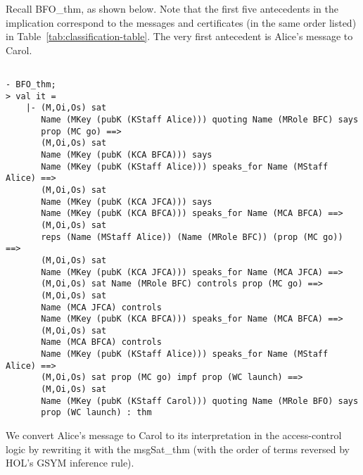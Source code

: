 \documentclass[10pt,twoside]{article}
\begin{document}
Recall BFO\_thm, as shown below. Note that the first five antecedents
in the implication correspond to the messages and certificates (in the
same order listed) in Table~\ref{tab:classification-table}. The very
first antecedent is Alice's message to Carol.
\begin{session}
  \begin{scriptsize}
\begin{verbatim}

- BFO_thm;
> val it =
    |- (M,Oi,Os) sat
       Name (MKey (pubK (KStaff Alice))) quoting Name (MRole BFC) says
       prop (MC go) ==>
       (M,Oi,Os) sat
       Name (MKey (pubK (KCA BFCA))) says
       Name (MKey (pubK (KStaff Alice))) speaks_for Name (MStaff Alice) ==>
       (M,Oi,Os) sat
       Name (MKey (pubK (KCA JFCA))) says
       Name (MKey (pubK (KCA BFCA))) speaks_for Name (MCA BFCA) ==>
       (M,Oi,Os) sat
       reps (Name (MStaff Alice)) (Name (MRole BFC)) (prop (MC go)) ==>
       (M,Oi,Os) sat
       Name (MKey (pubK (KCA JFCA))) speaks_for Name (MCA JFCA) ==>
       (M,Oi,Os) sat Name (MRole BFC) controls prop (MC go) ==>
       (M,Oi,Os) sat
       Name (MCA JFCA) controls
       Name (MKey (pubK (KCA BFCA))) speaks_for Name (MCA BFCA) ==>
       (M,Oi,Os) sat
       Name (MCA BFCA) controls
       Name (MKey (pubK (KStaff Alice))) speaks_for Name (MStaff Alice) ==>
       (M,Oi,Os) sat prop (MC go) impf prop (WC launch) ==>
       (M,Oi,Os) sat
       Name (MKey (pubK (KStaff Carol))) quoting Name (MRole BFO) says
       prop (WC launch) : thm
\end{verbatim}
  \end{scriptsize}
\end{session}
We convert Alice's message to Carol to its interpretation in the
access-control logic by rewriting it with the msgSat\_thm (with the
order of terms reversed by HOL's GSYM inference rule).
\end{document}
